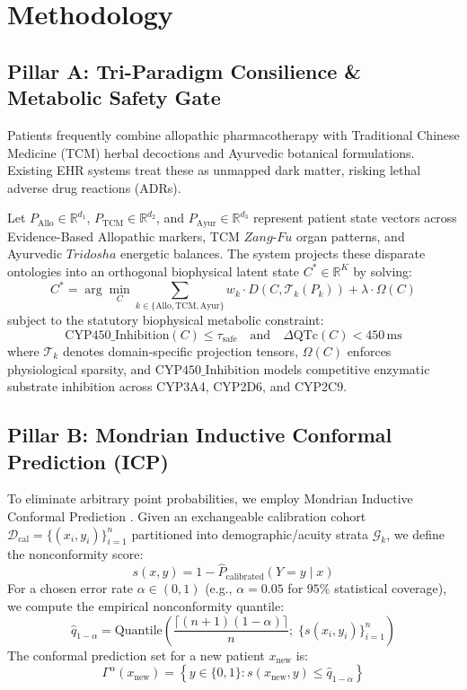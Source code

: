 \documentclass[11pt,a4paper]{article}
\theoremstyle{definition}
\begin{document}
\section{Methodology}

\subsection{Pillar A: Tri-Paradigm Consilience & Metabolic Safety Gate}
Patients frequently combine allopathic pharmacotherapy with Traditional Chinese Medicine (TCM) herbal decoctions and Ayurvedic botanical formulations. Existing EHR systems treat these as unmapped dark matter, risking lethal adverse drug reactions (ADRs).

Let $P_{\text{Allo}} \in \mathbb{R}^{d_1}$, $P_{\text{TCM}} \in \mathbb{R}^{d_2}$, and $P_{\text{Ayur}} \in \mathbb{R}^{d_3}$ represent patient state vectors across Evidence-Based Allopathic markers, TCM $Zang$-$Fu$ organ patterns, and Ayurvedic $Tridosha$ energetic balances. The system projects these disparate ontologies into an orthogonal biophysical latent state $C^* \in \mathbb{R}^K$ by solving:
\begin{equation}
C^* = \arg\min_{C} \sum_{k \in \{\text{Allo}, \text{TCM}, \text{Ayur}\}} w_k \cdot D(C, \mathcal{T}_k(P_k)) + \lambda \cdot \Omega(C)
\end{equation}
subject to the statutory biophysical metabolic constraint:
\begin{equation}
\text{CYP450\_Inhibition}(C) \le \tau_{\text{safe}} \quad \text{and} \quad \Delta\text{QTc}(C) < 450\,\text{ms}
\end{equation}
where $\mathcal{T}_k$ denotes domain-specific projection tensors, $\Omega(C)$ enforces physiological sparsity, and $\text{CYP450\_Inhibition}$ models competitive enzymatic substrate inhibition across CYP3A4, CYP2D6, and CYP2C9.

\subsection{Pillar B: Mondrian Inductive Conformal Prediction (ICP)}
To eliminate arbitrary point probabilities, we employ Mondrian Inductive Conformal Prediction \cite{vovk2005algorithmic,angelopoulos2023conformal}. Given an exchangeable calibration cohort $\mathcal{D}_{\text{cal}} = \{(x_i, y_i)\}_{i=1}^n$ partitioned into demographic/acuity strata $\mathcal{G}_k$, we define the nonconformity score:
\begin{equation}
s(x, y) = 1 - \hat{P}_{\text{calibrated}}(Y = y \mid x)
\end{equation}
For a chosen error rate $\alpha \in (0, 1)$ (e.g., $\alpha = 0.05$ for $95\%$ statistical coverage), we compute the empirical nonconformity quantile:
\begin{equation}
\hat{q}_{1-\alpha} = \text{Quantile}\left( \frac{\lceil (n+1)(1-\alpha) \rceil}{n}; \; \{s(x_i, y_i)\}_{i=1}^n \right)
\end{equation}
The conformal prediction set for a new patient $x_{\text{new}}$ is:
\begin{equation}
\Gamma^\alpha(x_{\text{new}}) = \left\{ y \in \{0, 1\} : s(x_{\text{new}}, y) \le \hat{q}_{1-\alpha} \right\}
\end{equation}
\end{document}
